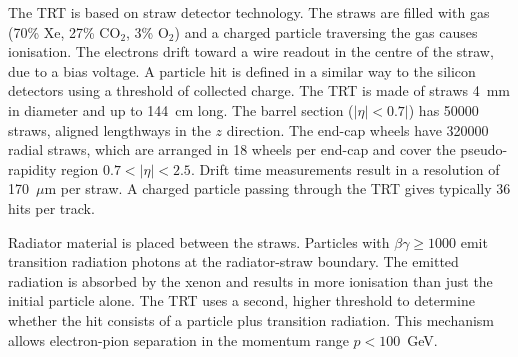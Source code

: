 The TRT is based on straw detector technology. The straws are filled with gas (70\% Xe, 27\% CO$_2$, 3\% O$_2$) and a charged particle traversing the gas causes ionisation. The electrons drift toward a wire readout in the centre of the straw, due to a bias voltage. A particle hit is defined in a similar way to the silicon detectors using a threshold of collected charge.
The TRT is made of straws 4~mm in diameter and up to 144~cm long. The barrel section ($|\eta|<0.7|$) has 50000 straws, aligned lengthways in the $z$ direction. The end-cap wheels have 320000 radial straws, which are arranged in 18 wheels per end-cap and cover the pseudo-rapidity region $0.7<|\eta|<2.5$. Drift time measurements result in a resolution of 170~$\mu$m per straw. A charged particle passing through the TRT gives typically 36 hits per track.

Radiator material is placed between the straws. Particles with $\beta\gamma \geq 1000$ emit transition radiation photons at the radiator-straw boundary. The emitted radiation is absorbed by the xenon and results in more ionisation than just the initial particle alone. The TRT uses a second, higher threshold to determine whether the hit consists of a particle plus transition radiation. This mechanism allows electron-pion separation in the momentum range $p < 100$~GeV. 



